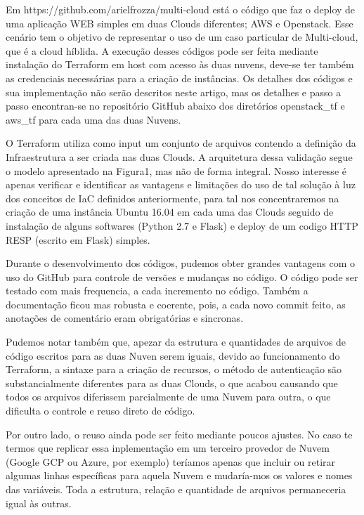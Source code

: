 \documentclass[12pt]{article}
\begin{document}
	Em https://github.com/arielfrozza/multi-cloud está o código que faz o deploy de uma aplicação WEB simples em duas Clouds diferentes; AWS e Openstack. Esse cenário tem o objetivo de representar o uso de um caso particular de Multi-cloud, que é a cloud híblida. A execução desses códigos pode ser feita mediante instalação do Terraform em host com acesso às duas nuvens, deve-se ter também as credenciais necessárias para a criação de instâncias. Os detalhes dos códigos e sua implementação não serão descritos neste artigo, mas os detalhes e passo a passo encontran-se no repositório GitHub abaixo dos diretórios openstack\_tf e aws\_tf para cada uma das duas Nuvens.
	
	O Terraform utiliza como input um conjunto de arquivos contendo a definição da Infraestrutura a ser criada nas duas Clouds. A arquitetura dessa validação segue o modelo apresentado na Figura1, mas não de forma integral. Nosso interesse é apenas verificar e identificar as vantagens e limitações do uso de tal solução à luz dos conceitos de IaC definidos anteriormente, para tal nos concentraremos na criação de uma instância Ubuntu 16.04 em cada uma das Clouds seguido de instalação de alguns softwares (Python 2.7 e Flask) e deploy de um codigo HTTP RESP (escrito em Flask) simples.	
	
	Durante o desenvolvimento dos códigos, pudemos obter grandes vantagens com o uso do GitHub para controle de versões e mudanças no código. O código pode ser testado com mais frequencia, a cada incremento no código. Também a documentação ficou mas robusta e coerente, pois, a cada novo commit feito, as anotações de comentário eram obrigatórias e sincronas.
	
	Pudemos notar também que, apezar da estrutura e quantidades de arquivos de código escritos para as duas Nuven serem iguais, devido ao funcionamento do Terraform, a     sintaxe para a criação de recursos, o método de autenticação são substancialmente diferentes para as duas Clouds, o que acabou causando que todos os arquivos diferissem parcialmente de uma Nuvem para outra, o que dificulta o controle e reuso direto de código.
	
	Por outro lado, o reuso ainda pode ser feito mediante poucos ajustes. No caso te termos que replicar essa inplementação em um terceiro provedor de Nuvem (Google GCP ou Azure, por exemplo) teríamos apenas que incluir ou retirar algumas linhas específicas para aquela Nuvem e mudaría-mos os valores e nomes das variáveis. Toda a estrutura, relação e quantidade de arquivos permaneceria igual às outras. 
	
\end{document}
